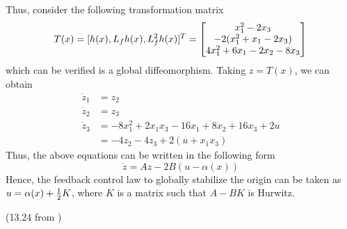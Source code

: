 \documentclass[a4 paper, 12pt]{article}
\begin{document}
Thus, consider the following transformation matrix
\begin{equation}
        T(x) = [h(x), L_fh(x), L_f^2h(x)]^T = \begin{bmatrix} x_1^2 - 2x_3 \\ -2(x_1^2+x_1-2x_3) \\ 4x_1^2+6x_1-2x_2-8x_3 \end{bmatrix}
\end{equation}
which can be verified is a global diffeomorphism. Taking $z=T(x)$, we can obtain
\begin{align}
        \dot{z}_1 &= z_2 \\
        \dot{z}_2 &= z_3 \\
        \dot{z}_3 &= -8x_1^2 +2x_1x_3 - 16x_1 + 8x_2 + 16x_3 + 2u \\
                  &= -4z_2 - 4z_3 + 2(u + x_1x_3)
\end{align}
Thus, the above equations can be written in the following form
\begin{equation}
        \dot{z} = Az - 2B(u-\alpha(x))
\end{equation}
Hence, the feedback control law to globally stabilize the origin can be taken as $u=\alpha(x)+\frac{1}{2} K$, where $K$ is a matrix such that $A-BK$ is Hurwitz.


 (13.24 from \cite{c1})
\end{document}
